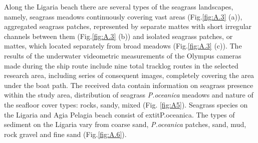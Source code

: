 \documentclass[10pt, a4paper]{article}
\begin{document}
Along the Ligaria beach there are several types of the seagrass landscapes, namely, seagrass meadows
continuously covering vast areas (Fig.\ref{fig:A.3} (a)), aggregated seagrass patches, represented by separate mattes with short irregular channels between them (Fig.\ref{fig:A.3} (b)) and isolated seagrass patches, or mattes,
which located separately from broad meadows (Fig.\ref{fig:A.3} (c)).
The results of the underwater videometric measurements of the Olympus cameras made during the
ship route include nine total tracklog routes in the selected research area, including series of
consequent images, completely covering the area under the boat path. The received data contain
information on seagrass presence within the study area, distribution of seagrass \textit{P.oceanica} meadows
and nature of the seafloor cover types: rocks, sandy, mixed (Fig. \ref{fig:A5}). Seagrass species on the Ligaria and Agia
Pelagia beach consist of 	extit{P.oceanica}. The types of sediment on the Ligaria vary from coarse sand,
\textit{P.oceanica} patches, sand, mud, rock gravel and fine sand (Fig.\ref{fig:A.6}).
\end{document}

